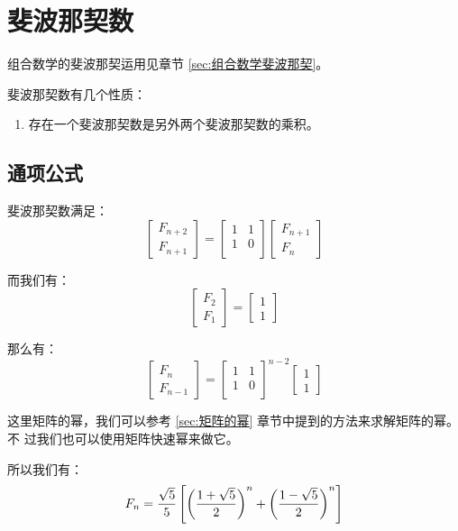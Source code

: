 \section{斐波那契数}
\label{sec:斐波那契}

组合数学的斐波那契运用见章节 \ref{sec:组合数学斐波那契}。

斐波那契数有几个性质：
\begin{enumerate}
    \item 存在一个斐波那契数是另外两个斐波那契数的乘积。
\end{enumerate}

\subsection{通项公式}
斐波那契数满足：
\[
    \begin{bmatrix}
        F_{n+2} \\ F_{n+1}
    \end{bmatrix} =
    \begin{bmatrix}
        1 & 1 \\
        1 & 0 \\
    \end{bmatrix}
    \begin{bmatrix}
        F_{n+1} \\ F_n
    \end{bmatrix}
\]

而我们有：
\[
    \begin{bmatrix}
        F_2 \\ F_1
    \end{bmatrix} =
    \begin{bmatrix}
        1 \\ 1
    \end{bmatrix}
\]

那么有：
\[
    \begin{bmatrix}
        F_n \\ F_{n-1}
    \end{bmatrix} = 
    \begin{bmatrix}
        1 & 1 \\
        1 & 0 \\
    \end{bmatrix} ^{n-2}
    \begin{bmatrix}
        1 \\ 1
    \end{bmatrix}
\]

这里矩阵的幂，我们可以参考 \ref{sec:矩阵的幂} 章节中提到的方法来求解矩阵的幂。不
过我们也可以使用矩阵快速幂来做它。

所以我们有：\[
    F_n = {\sqrt 5 \over 5} \left[ \left({1 + \sqrt 5 \over 2}\right)^n +
    \left({1 - \sqrt 5 \over 2}\right)^n \right]
\]
